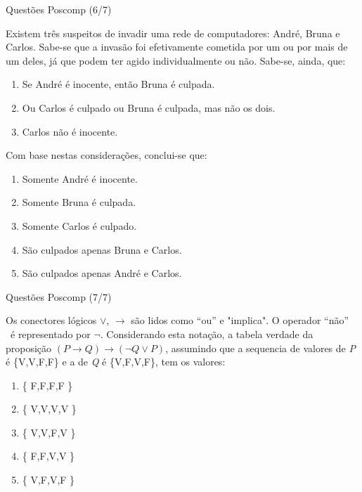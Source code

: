 \documentclass[aspectratio=169]{beamer}
\begin{document}
\begin{frame}{Questões Poscomp (6/7)}

    Existem três suspeitos de invadir uma rede de computadores: André, Bruna e Carlos.
    Sabe-se que a invasão foi efetivamente cometida por um ou por mais de um deles,
    já que podem ter agido individualmente ou não. Sabe-se, ainda, que:

    \begin{enumerate}[I]
        \item Se André é inocente, então Bruna é culpada.
        \item Ou Carlos é culpado ou Bruna é culpada, mas não os dois.
        \item Carlos não é inocente.
    \end{enumerate}

    Com base nestas considerações, conclui-se que:

    \begin{enumerate}[A]
        \item Somente André é inocente.
        \item Somente Bruna é culpada.
        \item Somente Carlos é culpado.
        \item São culpados apenas Bruna e Carlos.
        \item São culpados apenas André e Carlos.
    \end{enumerate}

\end{frame}


\begin{frame}{Questões Poscomp (7/7)}

    Os conectores lógicos $\vee$, $\rightarrow$ são lidos como ``ou'' e "implica".
    O operador ``não'' ~é representado por $\lnot$. Considerando esta notação,
    a tabela verdade da proposição $ (P \rightarrow Q) \rightarrow (\lnot Q \vee P)$,
    assumindo que a sequencia de valores de \textit{P} é \{V,V,F,F\} e a de \textit{Q} é \{V,F,V,F\},
    tem os valores:

    \begin{enumerate}[a]
        \item \{ F,F,F,F \}
        \item \{ V,V,V,V \}
        \item \{ V,V,F,V \}
        \item \{ F,F,V,V \}
        \item \{ V,F,V,F \}
    \end{enumerate}


\end{frame}
\end{document}
